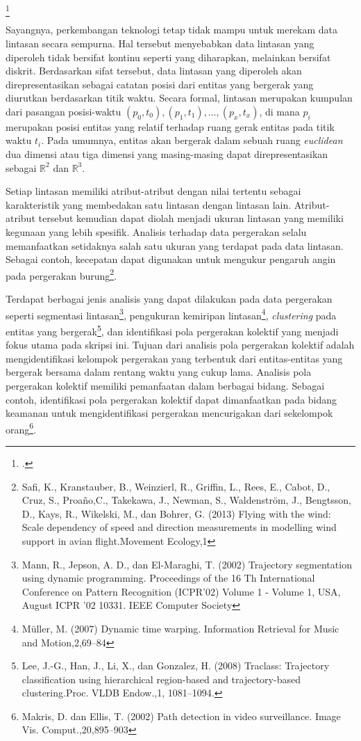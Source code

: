 \documentclass[a4paper,twoside]{article}
\begin{document}
\footcite{carter:argos}

\fi

Sayangnya, perkembangan teknologi tetap tidak mampu untuk merekam data lintasan secara sempurna. Hal tersebut menyebabkan data lintasan yang diperoleh tidak bersifat kontinu seperti yang diharapkan, melainkan bersifat diskrit. Berdasarkan sifat tersebut, data lintasan yang diperoleh akan direpresentasikan sebagai catatan posisi dari entitas yang bergerak yang diurutkan berdasarkan titik waktu. Secara formal, lintasan merupakan kumpulan dari pasangan posisi-waktu $(p_0, t_0), (p_1, t_1), \ldots, (p_x, t_x)$, di mana $p_i$ merupakan posisi entitas yang relatif terhadap ruang gerak entitas pada titik waktu $t_i$. Pada umumnya, entitas akan bergerak dalam sebuah ruang \textit{euclidean} dua dimensi atau tiga dimensi yang masing-masing dapat direpresentasikan sebagai 
$\mathbb{R}^2$ dan $\mathbb{R}^3$.

Setiap lintasan memiliki atribut-atribut dengan nilai tertentu sebagai karakteristik yang membedakan satu lintasan dengan lintasan lain. Atribut-atribut tersebut kemudian dapat diolah menjadi ukuran lintasan yang memiliki kegunaan yang lebih spesifik. Analisis terhadap data pergerakan selalu memanfaatkan setidaknya salah satu ukuran yang terdapat pada data lintasan. Sebagai contoh, kecepatan dapat digunakan untuk mengukur pengaruh angin pada pergerakan burung\footnote{Safi, K., Kranstauber, B., Weinzierl, R., Griffin, L., Rees, E., Cabot, D., Cruz, S., Proaño,C., Takekawa, J., Newman, S., Waldenström, J., Bengtsson, D., Kays, R., Wikelski, M., dan Bohrer, G. (2013) Flying with the wind: Scale dependency of speed and direction measurements in modelling wind support in avian flight.Movement Ecology,1}.

Terdapat berbagai jenis analisis yang dapat dilakukan pada data pergerakan seperti segmentasi lintasan\footnote{Mann, R., Jepson, A. D., dan El-Maraghi, T. (2002) Trajectory segmentation using dynamic programming. Proceedings of the 16 Th International Conference on Pattern Recognition (ICPR’02) Volume 1 - Volume 1, USA, August ICPR ’02 10331. IEEE Computer Society}, pengukuran kemiripan lintasan\footnote{M\"{u}ller, M. (2007) Dynamic time warping. Information Retrieval for Music and Motion,2,69–84}, \textit{clustering} pada entitas yang bergerak\footnote{Lee, J.-G., Han, J., Li, X., dan Gonzalez, H. (2008) Traclass: Trajectory classification using hierarchical region-based and trajectory-based clustering.Proc. VLDB Endow.,1, 1081–1094.}, dan identifikasi pola pergerakan kolektif yang menjadi fokus utama pada skripsi ini. Tujuan dari analisis pola pergerakan kolektif adalah mengidentifikasi kelompok pergerakan yang terbentuk dari entitas-entitas yang bergerak bersama dalam rentang waktu yang cukup lama. Analisis pola pergerakan kolektif memiliki pemanfaatan dalam berbagai bidang. Sebagai contoh, identifikasi pola pergerakan kolektif dapat dimanfaatkan pada bidang keamanan untuk mengidentifikasi pergerakan mencurigakan dari sekelompok orang\footnote{Makris, D. dan Ellis, T. (2002) Path detection in video surveillance. Image Vis. Comput.,20,895–903}.
\end{document}
